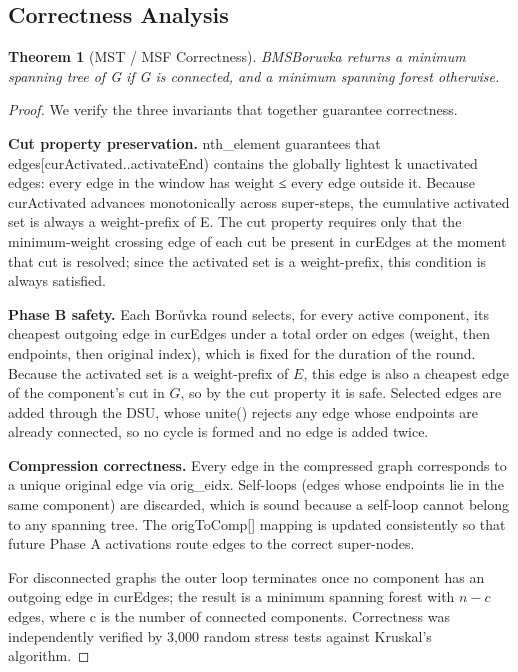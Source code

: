 \documentclass[11pt]{article}
\theoremstyle{plain}
\newtheorem{theorem}{Theorem}
\theoremstyle{remark}
\begin{document}
\subsection{Correctness Analysis}

\begin{theorem}[MST / MSF Correctness]
BMSBoruvka returns a
minimum spanning tree of G if G is connected, and a minimum spanning
forest otherwise.
\end{theorem}

\begin{proof}
We verify the three invariants that together guarantee
correctness.

\textbf{Cut property preservation.} nth\_element guarantees that
edges{[}curActivated..activateEnd) contains the globally lightest k
unactivated edges: every edge in the window has weight ≤ every edge
outside it. Because curActivated advances monotonically across
super-steps, the cumulative activated set is always a weight-prefix of
E. The cut property requires only that the minimum-weight crossing edge
of each cut be present in curEdges at the moment that cut is resolved;
since the activated set is a weight-prefix, this condition is always
satisfied.

\textbf{Phase B safety.} Each Borůvka round selects, for every active
component, its cheapest outgoing edge in curEdges under a total order on
edges (weight, then endpoints, then original index), which is fixed for
the duration of the round. Because the activated set is a weight-prefix
of \(E\), this edge is also a cheapest edge of the component's cut in
\(G\), so by the cut property it is safe. Selected edges are added
through the DSU, whose unite() rejects any edge whose endpoints are
already connected, so no cycle is formed and no edge is added twice.

\textbf{Compression correctness.} Every edge in the compressed graph
corresponds to a unique original edge via orig\_eidx. Self-loops (edges
whose endpoints lie in the same component) are discarded, which is sound
because a self-loop cannot belong to any spanning tree. The
origToComp{[}{]} mapping is updated consistently so that future Phase A
activations route edges to the correct super-nodes.

For disconnected graphs the outer loop terminates once no component has
an outgoing edge in curEdges; the result is a minimum spanning forest
with \(n - c\) edges, where c is the number of connected components.
Correctness was independently verified by 3,000 random stress tests
against Kruskal's algorithm.
\end{proof}
\end{document}
